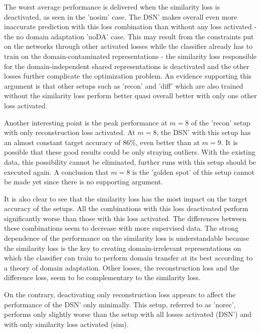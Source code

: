 The worst average performance is delivered when the similarity loss is deactivated, as seen in the 'nosim' case. The DSN' makes overall even more inaccurate prediction with this loss combination than without any loss activated - the no domain adaptation 'noDA' case. This may result from the constraints put on the networks through other activated losses while the classifier already has to train on the domain-contaminated representations - the similarity loss responsible for the domain-independent shared representations is deactivated and the other losses further complicate the optimization problem. An evidence supporting this argument is that other setups such as 'recon' and 'diff' which are also trained without the similarity loss perform better quasi overall better with only one other loss activated. 

Another interesting point is the peak performance at $m = 8$ of the 'recon' setup with only reconstruction loss activated. At $m = 8$, the DSN' with this setup has an almost constant target accuracy of 86\%, even better than at $m = 9$. It is possible that these good results could be only straying outliers. With the existing data, this possibility cannot be eliminated, further runs with this setup should be executed again. A conclusion that $m = 8$ is the 'golden spot' of this setup cannot be made yet since there is no supporting argument. 

It is also clear to see that the similarity loss has the most impact on the target accuracy of the setups. All the combinations with this loss deactivated perform significantly worse than those with this loss activated. The differences between these combinations seem to decrease with more supervised data. The strong dependence of the performance on the similarity loss is understandable because the similarity loss is the key to creating domain-irrelevant representations on which the classifier can train to perform domain transfer at its best according to a theory of domain adaptation. Other losses, the reconstruction loss and the difference loss, seem to be complementary to the similarity loss.

On the contrary, deactivating only reconstruction loss appears to affect the performance of the DSN' only minimally. This setup, referred to as 'norec', performs only slightly worse than the setup with all losses activated (DSN') and with only similarity loss activated (sim). 

